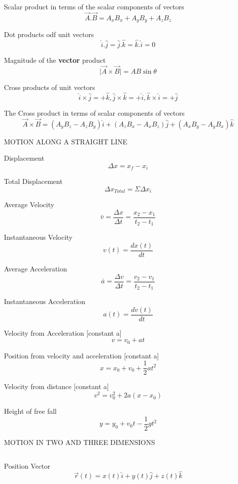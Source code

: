 \documentclass[12pt, letterpaper, twoside]{article}
\begin{document}
Scalar product in terms of the scalar components of vectors
$$\overrightarrow{A} . \overrightarrow{B}= A_x B_x + A_y B_y + A_z B_z$$



Dot products odf unit vectors
$$\hat{i} . \hat{j} = \hat{j} . \hat{k} = \hat{k} . \hat{i} = 0$$



Magnitude of the \textbf{vector} product
$$\mid \overrightarrow{A} \times \overrightarrow{B} \mid= AB \sin \theta$$



Cross products of unit vectors
$$\hat{i} \times \hat{j} =+ \hat{k}, \hat{j} \times \hat{k} = +\hat{i}, \hat{k} \times \hat{i} =+ \hat{j}$$
 



The Cross product in terms of scalar components of vectors
$$\overrightarrow{A} \times \overrightarrow{B} = (A_y B_z - A_z B_y) \hat{i} + (A_z B_x - A_x B_z) \hat{j} + (A_x B_y - A_y B_x) \hat{k}$$



\newpage

MOTION ALONG A STRAIGHT LINE
$$ $$



Displacement
$$\Delta x = x_f - x_i$$


Total Displacement
$$\Delta x_{Total} = \Sigma \Delta x_i$$

Average Velocity
$$\bar{v} = \frac{\Delta x}{\Delta t} = \frac{x_2 - x_1}{t_2 - t_1}$$

Instantaneous Velocity
$$v(t) = \frac{dx(t)}{dt}$$

Average Acceleration
$$\bar{a} = \frac{\Delta v}{\Delta t} = \frac{v_2 - v_1}{t_2 - t_1}$$

Instantaneous Acceleration
$$a(t) = \frac{dv(t)}{dt}$$

Velocity from Acceleration [constant a]
$$v = v_0 + at$$

Position from velocity and acceleration [constant a]
$$x = x_0 + v_0 + \frac{1}{2} a t^2$$

Velocity from distance [constant a]
$$v^2 = v_0^2 + 2a(x - x_0)$$

Height of free fall
$$y = y_0 + v_0 t - \frac{1}{2} g t^2$$


\newpage

MOTION IN TWO AND THREE DIMENSIONS

$$ $$  

Position Vector
$$\overrightarrow{r}(t) = x(t) \hat{i} + y(t) \hat{j} + z(t) \hat{k}$$
\end{document}
